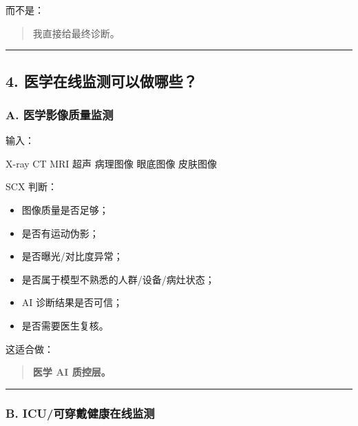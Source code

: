 \documentclass[
  12pt,
]{ctexart}
\newenvironment{Shaded}{}{}
\newcommand{\NormalTok}[1]{#1}
\providecommand{\tightlist}{%
  \setlength{\itemsep}{0pt}\setlength{\parskip}{0pt}}
\begin{document}
而不是：

\begin{quote}
我直接给最终诊断。
\end{quote}

\begin{center}\rule{0.5\linewidth}{0.5pt}\end{center}

\subsection{4.
医学在线监测可以做哪些？}\label{ux533bux5b66ux5728ux7ebfux76d1ux6d4bux53efux4ee5ux505aux54eaux4e9b}

\subsubsection{A.
医学影像质量监测}\label{a.-ux533bux5b66ux5f71ux50cfux8d28ux91cfux76d1ux6d4b}

输入：

\begin{Shaded}
\begin{Highlighting}[]
\NormalTok{X{-}ray}
\NormalTok{CT}
\NormalTok{MRI}
\NormalTok{超声}
\NormalTok{病理图像}
\NormalTok{眼底图像}
\NormalTok{皮肤图像}
\end{Highlighting}
\end{Shaded}

SCX 判断：

\begin{itemize}
\tightlist
\item
  图像质量是否足够；
\item
  是否有运动伪影；
\item
  是否曝光/对比度异常；
\item
  是否属于模型不熟悉的人群/设备/病灶状态；
\item
  AI 诊断结果是否可信；
\item
  是否需要医生复核。
\end{itemize}

这适合做：

\begin{quote}
\textbf{医学 AI 质控层。}
\end{quote}

\begin{center}\rule{0.5\linewidth}{0.5pt}\end{center}

\subsubsection{B.
ICU/可穿戴健康在线监测}\label{b.-icuux53efux7a7fux6234ux5065ux5eb7ux5728ux7ebfux76d1ux6d4b}
\end{document}
